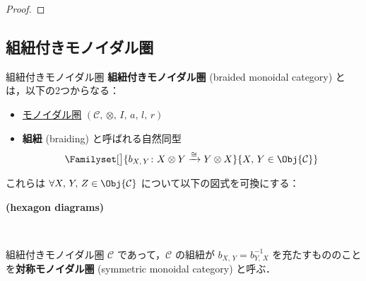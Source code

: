 \documentclass[TQFT_main]{subfiles}
\begin{document}
\begin{proof}
\end{proof}

\subsection{組紐付きモノイダル圏}

\begin{mydef}[label=redef:braided-monoidal]{組紐付きモノイダル圏}
    \textbf{組紐付きモノイダル圏} (braided monoidal category) とは，以下の2つからなる：
    \begin{itemize}
        \item \hyperref[redef:monoidal-category]{モノイダル圏} $(\mathcal{C},\, \otimes,\, I,\, a,\, l,\, r)$
        \item \textbf{組紐} (braiding) と呼ばれる自然同型
        \begin{align}
            \Familyset[\big]{b_{X,\, Y} \colon X \otimes Y \xrightarrow{\cong} Y \otimes X}{X,\, Y \in \Obj{\mathcal{C}}}
        \end{align}
    \end{itemize}
    これらは $\forall X,\, Y,\, Z \in \Obj{\mathcal{C}}$ について以下の図式を可換にする：
    \begin{description}
        \item[\textbf{(hexagon diagrams)}]　
        
        \begin{center}
        \end{center}
        
        \begin{center}
        \end{center}
    \end{description}
    \tcblower
    組紐付きモノイダル圏 $\mathcal{C}$ であって，$\mathcal{C}$ の組紐が $b_{X,\, Y} = b_{Y,\, X}^{-1}$ を充たすもののことを\textbf{対称モノイダル圏} (symmetric monoidal category) と呼ぶ．
\end{mydef}
\end{document}
